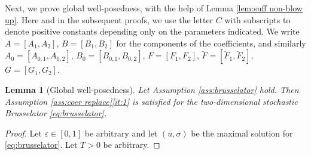 \documentclass{amsart}
\newcommand{\<}{\langle}
\newcommand{\?}{\rangle}
\theoremstyle{plain}
\theoremstyle{remark}
\theoremstyle{plain}
\newtheorem{lemma}[theorem]{Lemma}
\numberwithin{equation}{section}
\newcommand{\eps}{\varepsilon}
\begin{document}
Next, we prove global well-posedness, with the help of Lemma \ref{lem:suff non-blow up}. Here and in the subsequent proofs, we use the letter $C$ with subscripts to denote positive constants depending only on the parameters indicated. We write $A=[A_1, A_2]$, $B=[B_1,B_2]$ for the components of the coefficients, and similarly $A_0=[A_{0,1},A_{0,2}]$, $B_0=[B_{0,1},B_{0,2}]$, $F= [F_1,F_2]$, $\breve{F}=[\breve{F}_1,\breve{F}_2]$, $G= [G_1,G_2]$.

\begin{lemma}[Global well-posedness]\label{lem:glob bruss}
Let Assumption \ref{ass:brusselator} hold. Then  Assumption \ref{ass:coer replace}\ref{it:1} is satisfied for the two-dimensional stochastic Brusselator \eqref{eq:brusselator}. 
\end{lemma}

\begin{proof}
Let  $\eps\in[0,1]$ be arbitrary and let $(u,\sigma)$ be the maximal solution for \eqref{eq:brusselator}.  Let $T>0$ be arbitrary. 


\end{proof}
\end{document}
